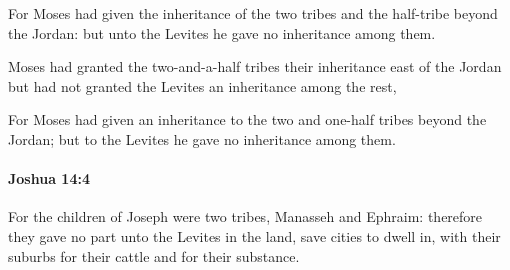 			\begin{versebox}
					\item[BHS] 
					\item[ASV] For Moses had given the inheritance of the two tribes and the half-tribe beyond the Jordan: but unto the Levites he gave no inheritance among them.
					\item[NIV] Moses had granted the two-and-a-half tribes their inheritance east of the Jordan but had not granted the Levites an inheritance among the rest,
					\item[NRSV] For Moses had given an inheritance to the two and one-half tribes beyond the Jordan; but to the Levites he gave no inheritance among them.
			\end{versebox}

		\paragraph{Joshua 14:4} %
			\label{JOSHUA-14-4}

			For the children of Joseph were two tribes, Manasseh and Ephraim: therefore they gave no part unto the Levites in the land, save cities to dwell in, with their suburbs for their cattle and for their substance.

